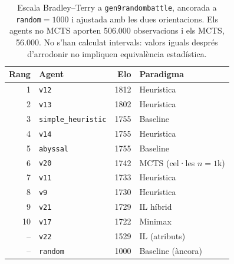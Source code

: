 \begin{table}[htbp]
\centering
\caption{Escala Bradley--Terry a \texttt{gen9randombattle}, ancorada a \texttt{random}${}=1000$ i ajustada amb les dues orientacions. Els agents no MCTS aporten 506.000 observacions i els MCTS, 56.000. No s'han calculat intervals: valors iguals després d'arrodonir no impliquen equivalència estadística.}
\label{tab:elo_gen9}
\small
\begin{tabular}{rlrl}
\toprule
\textbf{Rang} & \textbf{Agent} & \textbf{Elo} & \textbf{Paradigma} \\
\midrule
1  & \texttt{v12}               & 1812 & Heurística \\
2  & \texttt{v13}               & 1802 & Heurística \\
3  & \texttt{simple\_heuristic} & 1755 & Baseline \\
4  & \texttt{v14}               & 1755 & Heurística \\
5  & \texttt{abyssal}           & 1755 & Baseline \\
6  & \texttt{v20}               & 1742 & MCTS (cel·les $n=1$k) \\
7  & \texttt{v11}               & 1733 & Heurística \\
8  & \texttt{v9}                & 1730 & Heurística \\
9  & \texttt{v21}               & 1729 & IL híbrid \\
10 & \texttt{v17}               & 1722 & Minimax \\
\midrule
-- & \texttt{v22}               & 1529 & IL (atributs) \\
-- & \texttt{random}            & 1000 & Baseline (àncora) \\
\bottomrule
\end{tabular}
\end{table}
